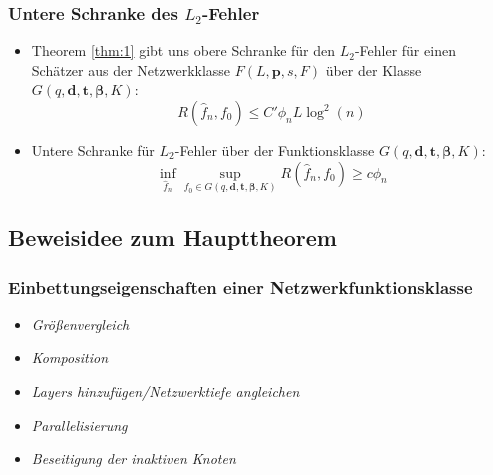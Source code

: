 \documentclass[hyperref={pdfpagelabels=false}]{beamer}
\begin{document}
\begin{frame}
\frametitle{Untere Schranke des $L_2$-Fehler}
\begin{itemize}
\item Theorem \ref{thm:1} gibt uns obere Schranke für den $L_2$-Fehler für einen Schätzer aus der Netzwerkklasse $F(L,\mathbf{p},s, F)$ über der Klasse $G(q,\mathbf{d},\mathbf{t}, \boldsymbol{\beta}, K)$: 
\begin{equation*}
R(\widehat{f}_n, f_0) \leq C' \phi _n L \log^2(n)
\end{equation*}
\item Untere Schranke für $L_2$-Fehler über der Funktionsklasse $G(q,\mathbf{d},\mathbf{t}, \boldsymbol{\beta}, K)$:
\begin{equation*}
\inf_{\widehat{f}_n} \sup_{f_0 \in G(q,\mathbf{d},\mathbf{t}, \boldsymbol{\beta}, K)} R(\widehat{f}_n, f_0) \geq c \phi_n
\end{equation*}
\end{itemize}
\end{frame}


\subsection{Beweisidee zum Haupttheorem}
\begin{frame}
\frametitle{Einbettungseigenschaften einer Netzwerkfunktionsklasse}
\begin{itemize}
\item \textit{Größenvergleich} 
\item \textit{Komposition}
\item \textit{Layers hinzufügen/Netzwerktiefe angleichen} 
\item \textit{Parallelisierung}
\item \textit{Beseitigung der inaktiven Knoten}
\end{itemize}
\end{frame}
\end{document}
